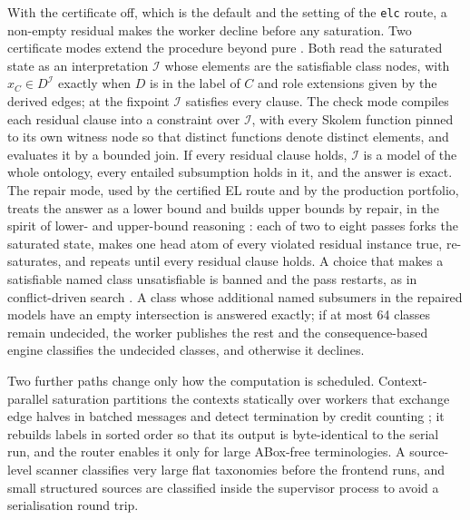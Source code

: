 With the certificate off, which is the default and the setting of the
\texttt{elc} route, a non-empty residual makes the worker decline before any
saturation.  Two certificate modes extend the procedure beyond pure \EL{}.
Both read the saturated state as an interpretation $\mathcal{I}$ whose elements
are the satisfiable class nodes, with $x_C\in D^{\mathcal{I}}$ exactly when $D$
is in the label of $C$ and role extensions given by the derived edges; at the
fixpoint $\mathcal{I}$ satisfies every \EL{} clause.  The check mode compiles
each residual clause into a constraint over $\mathcal{I}$, with every Skolem
function pinned to its own witness node so that distinct functions denote
distinct elements, and evaluates it by a bounded join.  If every residual
clause holds, $\mathcal{I}$ is a model of the whole ontology, every entailed
subsumption holds in it, and the \EL{} answer is exact.  The repair mode, used
by the certified EL route and by the production portfolio, treats the \EL{}
answer as a lower bound and builds upper bounds by repair, in the spirit of
lower- and upper-bound reasoning \cite{zhou2015pagoda}: each of two to eight
passes forks the saturated state, makes one head atom of every violated
residual instance true, re-saturates, and repeats until every residual clause
holds.  A choice that makes a satisfiable named class unsatisfiable is banned
and the pass restarts, as in conflict-driven search
\cite{marquessilva1999grasp}.  A class whose additional named subsumers in the
repaired models have an empty intersection is answered exactly; if at most 64
classes remain undecided, the worker publishes the rest and the
consequence-based engine classifies the undecided classes, and otherwise it
declines.

Two further paths change only how the computation is scheduled.  Context-parallel
saturation partitions the contexts statically over workers that exchange edge
halves in batched messages and detect termination by credit counting
\cite{mattern1989credit}; it rebuilds labels in sorted order so that its output
is byte-identical to the serial run, and the router enables it only for large
ABox-free \EL{} terminologies.  A source-level scanner classifies very large
flat taxonomies before the frontend runs, and small structured sources are
classified inside the supervisor process to avoid a serialisation round trip.

